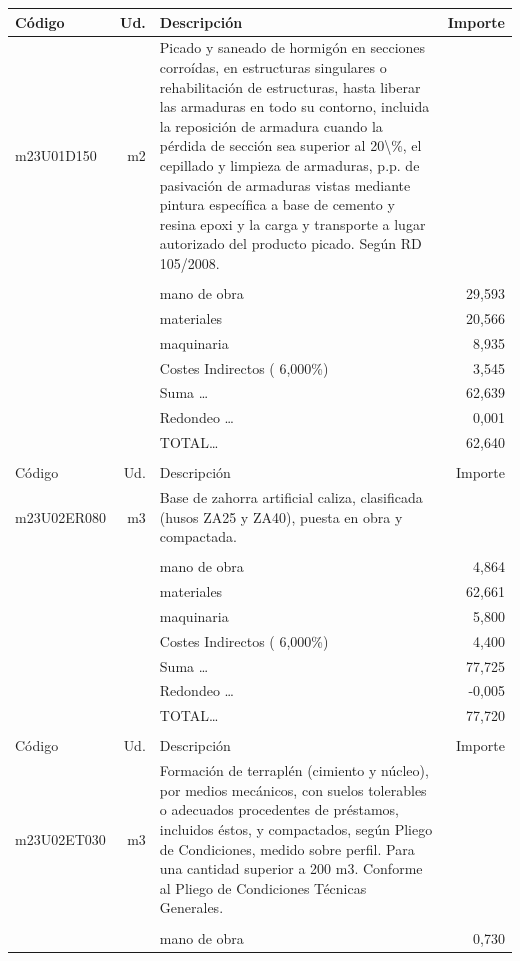 \begin{supertabular}{l r p{60mm} r}
Código&Ud.&Descripción&Importe\\%
\hline%
m23U01D150&m2&Picado y saneado de hormigón en secciones corroídas, en estructuras singulares o rehabilitación de estructuras, hasta liberar las armaduras en todo su contorno, incluida la reposición de armadura cuando la pérdida de sección sea superior al 20\textbackslash{}\%, el cepillado y limpieza de armaduras, p.p. de pasivación de armaduras vistas mediante pintura específica a base de cemento y resina epoxi y la carga y transporte a lugar autorizado del producto picado. Según RD 105/2008.&\\%
&&&\\%
&&mano de obra&    29,593\\%
&&materiales&    20,566\\%
&&maquinaria&     8,935\\%
&&Costes Indirectos (     6,000\%)&     3,545\\%
&&Suma \ldots&    62,639\\%
&&Redondeo \ldots&     0,001\\%
%
&&TOTAL\ldots&    62,640\\%
&&&\\%
Código&Ud.&Descripción&Importe\\%
\hline%
m23U02ER080&m3&Base de zahorra artificial caliza, clasificada (husos ZA25 y ZA40), puesta en obra y compactada.&\\%
&&&\\%
&&mano de obra&     4,864\\%
&&materiales&    62,661\\%
&&maquinaria&     5,800\\%
&&Costes Indirectos (     6,000\%)&     4,400\\%
&&Suma \ldots&    77,725\\%
&&Redondeo \ldots&    {-}0,005\\%
%
&&TOTAL\ldots&    77,720\\%
&&&\\%
Código&Ud.&Descripción&Importe\\%
\hline%
m23U02ET030&m3&Formación de terraplén (cimiento y núcleo), por medios mecánicos, con suelos tolerables o adecuados procedentes de préstamos, incluidos éstos, y compactados, según Pliego de Condiciones, medido sobre perfil. Para una cantidad superior a 200 m3. Conforme al Pliego de Condiciones Técnicas Generales.&\\%
&&&\\%
&&mano de obra&     0,730\\%

\end{supertabular}
